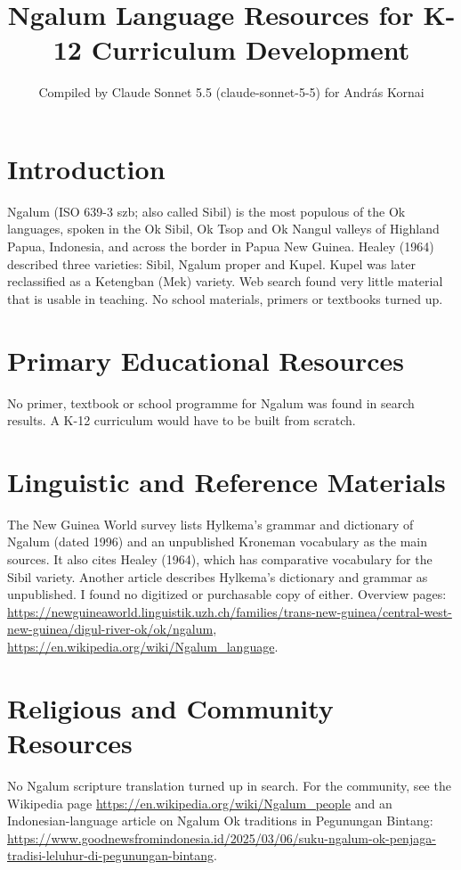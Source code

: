 \documentclass[12pt]{article}
\title{Ngalum Language Resources for K-12 Curriculum Development}
\author{Compiled by Claude Sonnet 5.5 (claude-sonnet-5-5) for Andr\'as Kornai}
\date{}
\begin{document}
\maketitle

\section{Introduction}
Ngalum (ISO 639-3 szb; also called Sibil) is the most populous of the Ok languages, spoken in the Ok Sibil, Ok Tsop and Ok Nangul valleys of Highland Papua, Indonesia, and across the border in Papua New Guinea. Healey (1964) described three varieties: Sibil, Ngalum proper and Kupel. Kupel was later reclassified as a Ketengban (Mek) variety. Web search found very little material that is usable in teaching. No school materials, primers or textbooks turned up.

\section{Primary Educational Resources}
No primer, textbook or school programme for Ngalum was found in search results. A K-12 curriculum would have to be built from scratch.

\section{Linguistic and Reference Materials}
The New Guinea World survey lists Hylkema's grammar and dictionary of Ngalum (dated 1996) and an unpublished Kroneman vocabulary as the main sources. It also cites Healey (1964), which has comparative vocabulary for the Sibil variety. Another article describes Hylkema's dictionary and grammar as unpublished. I found no digitized or purchasable copy of either. Overview pages: \url{https://newguineaworld.linguistik.uzh.ch/families/trans-new-guinea/central-west-new-guinea/digul-river-ok/ok/ngalum}, \url{https://en.wikipedia.org/wiki/Ngalum_language}.

\section{Religious and Community Resources}
No Ngalum scripture translation turned up in search. For the community, see the Wikipedia page \url{https://en.wikipedia.org/wiki/Ngalum_people} and an Indonesian-language article on Ngalum Ok traditions in Pegunungan Bintang: \url{https://www.goodnewsfromindonesia.id/2025/03/06/suku-ngalum-ok-penjaga-tradisi-leluhur-di-pegunungan-bintang}.
\end{document}
